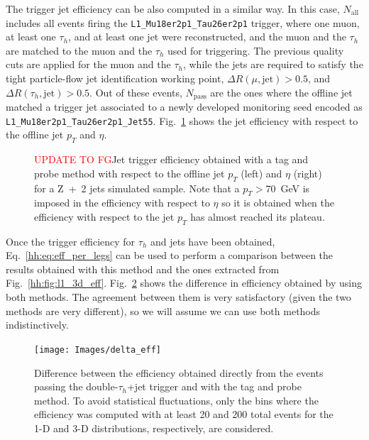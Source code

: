 \documentclass[../main.tex]{subfiles}
\begin{document}
The trigger jet efficiency can be also computed in a similar way. In this case, $N_\text{all}$ includes all events firing the \texttt{L1\_Mu18er2p1\_Tau26er2p1} trigger, where one muon, at least one $\tau_h$, and at least one jet were reconstructed, and the muon and the $\tau_h$ are matched to the muon and the $\tau_h$ used for triggering. The previous quality cuts are applied for the muon and the $\tau_h$, while the jets are required to satisfy the tight particle-flow jet identification working point, $\Delta R(\mu, \text{jet}) > 0.5$, and $\Delta R(\tau_h, \text{jet}) > 0.5$. Out of these events, $N_\text{pass}$ are the ones where the offline jet matched a trigger jet associated to a newly developed monitoring seed encoded as \texttt{L1\_Mu18er2p1\_Tau26er2p1\_Jet55}. Fig.~\ref{hh:fig:l1_eff_jetleg} shows the jet efficiency with respect to the offline jet $p_T$ and $\eta$.

\begin{figure}[h!]
\begin{center}
\end{center}
\caption{\textcolor{red}{UPDATE TO FG}Jet trigger efficiency obtained with a tag and probe method with respect to the offline jet $p_T$ (left) and $\eta$ (right) for a Z~+~2 jets simulated sample. Note that a $p_T>70$~GeV is imposed in the efficiency with respect to $\eta$ so it is obtained when the efficiency with respect to the jet $p_T$ has almost reached its plateau. }
\label{hh:fig:l1_eff_jetleg}
\end{figure}

Once the trigger efficiency for $\tau_h$ and jets have been obtained, Eq.~\eqref{hh:eq:eff_per_legs} can be used to perform a comparison between the results obtained with this method and the ones extracted from Fig.~\ref{hh:fig:l1_3d_eff}. Fig.~\ref{hh:fig:l1_delta_eff} shows the difference in efficiency obtained by using both methods. The agreement between them is very satisfactory (given the two methods are very different), so we will assume we can use both methods indistinctively.

\begin{figure}[h!]
\begin{center}
\texttt{[image: Images/delta\_eff]}
\end{center}
\caption{Difference between the efficiency obtained directly from the events passing the double-$\tau_h$+jet trigger and with the tag and probe method. To avoid statistical fluctuations, only the bins where the efficiency was computed with at least 20 and 200 total events for the 1-D and 3-D distributions, respectively, are considered.}
\label{hh:fig:l1_delta_eff}
\end{figure}
\end{document}
